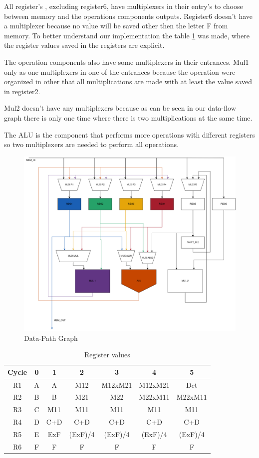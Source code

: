 \documentclass[12pt]{article}
\begin{document}
All register's , excluding register6, have multiplexers in their entry's to choose between memory and the operations components outputs. Register6 doesn't have a multiplexer because no value will be saved other then the letter F from memory. To better understand our implementation the table \ref{tab:reg} was made, where the register values saved in the registers are explicit.

The operation components also have some multiplexers in their entrances. Mul1 only as one multiplexers in one of the entrances because the operation were organized in other that all multiplications are made with at least the value saved in register2. 

Mul2 doesn't have any multiplexers because as can be seen in our data-flow graph there is only one time where there is two multiplications at the same time.

The ALU is the component that performs more operations with different registers so two multiplexers are needed to perform all operations.

\begin{figure}[H]
	\centering
	\includegraphics[width=0.7\linewidth]{Imagens/Datapath.png}
	\caption{Data-Path Graph}
	\label{fig:path}
\end{figure}

\begin{table}[H]
	\center
	\begin{tabular}{|c|c|c|c|c|c|c|}
		\hline
		Cycle & 0 & 1& 2&3&4&5\\
        \hline
        R1 &A&A&M12&M12xM21&M12xM21&Det\\
        \hline
        R2 &B&B&M21&M22&M22xM11&M22xM11\\
        \hline
        R3&C&M11&M11&M11&M11&M11\\
        \hline
        R4&D&C+D&C+D&C+D&C+D&C+D\\
        \hline
        R5&E&ExF&(ExF)/4&(ExF)/4&(ExF)/4&(ExF)/4\\
        \hline
        R6&F&F&F&F&F&F\\
        \hline
	\end{tabular}
	\caption{Register values}
	\label{tab:reg}
\end{table}
\end{document}
